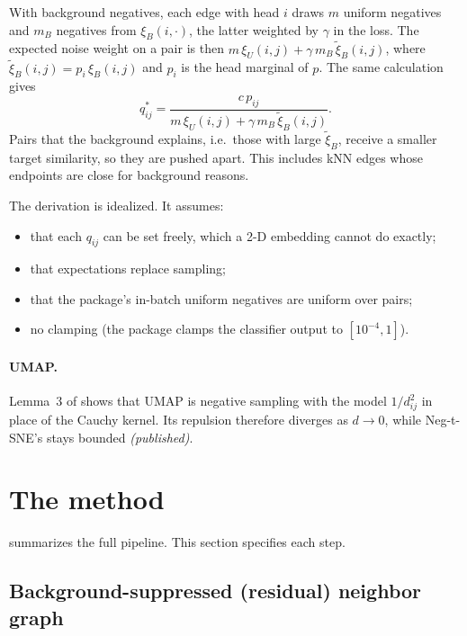 \documentclass[10pt]{article}
\newcommand{\cpub}{\textit{\small (published)}}
\newcommand{\xiB}{\xi_{B}}
\begin{document}
With background negatives, each edge with head $i$ draws $m$ uniform negatives and $m_B$ negatives from $\xiB(i,\cdot)$, the latter weighted by $\gamma$ in the loss. The expected noise weight on a pair is then $m\,\xi_U(i,j) + \gamma\, m_B\, \tilde\xi_B(i,j)$, where $\tilde\xi_B(i,j) = p_i\,\xiB(i,j)$ and $p_i$ is the head marginal of $p$. The same calculation gives
\begin{equation}
  q^*_{ij} = \frac{c\,p_{ij}}{m\,\xi_U(i,j) + \gamma\, m_B\, \tilde\xi_B(i,j)} .
  \label{eq:qstar-bg}
\end{equation}
Pairs that the background explains, i.e.\ those with large $\tilde\xi_B$, receive a smaller target similarity, so they are pushed apart. This includes kNN edges whose endpoints are close for background reasons.

The derivation is idealized. It assumes:
\begin{itemize}
  \item that each $q_{ij}$ can be set freely, which a 2-D embedding cannot do exactly;
  \item that expectations replace sampling;
  \item that the package's in-batch uniform negatives are uniform over pairs;
  \item no clamping (the package clamps the classifier output to $[10^{-4},1]$).
\end{itemize}

\paragraph{UMAP.} Lemma~3 of \cite{damrich2023tsne} shows that UMAP is negative sampling with the model $1/d_{ij}^2$ in place of the Cauchy kernel. Its repulsion therefore diverges as $d \to 0$, while Neg-t-SNE's stays bounded \cpub.

\section{The method}
\label{sec:method}

 summarizes the full pipeline. This section specifies each step.

\subsection{Background-suppressed (residual) neighbor graph}
\label{sec:residual}
\end{document}
